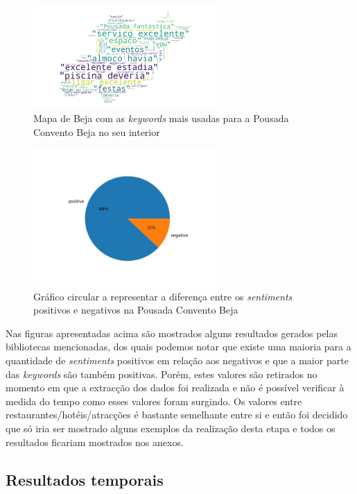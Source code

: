 \begin{figure}[!htb]
\centering
\includegraphics[width=7cm]{figuras/TripAdvisor/Hotels/hotel0_keywordcloud.jpeg}
\caption{Mapa de Beja com as \textit{keywords} mais usadas para a Pousada Convento Beja no seu interior}
\label{fig:exemplofig}
\end{figure}

\begin{figure}[!htb]
\centering
\includegraphics[width=7cm]{figuras/TripAdvisor/Hotels/hotel0_sentiments.jpeg}
\caption{Gráfico circular a representar a diferença entre os \textit{sentiments} positivos e negativos na Pousada Convento Beja}
\label{fig:exemplofig}
\end{figure}

\newpage

Nas figuras apresentadas acima são mostrados alguns resultados gerados pelas bibliotecas mencionadas, dos quais podemos notar que existe uma maioria para a quantidade de \textit{sentiments} positivos em relação aos negativos e que a maior parte das \textit{keywords} são também positivas. Porém, estes valores são retirados no momento em que a extracção dos dados foi realizada e não é possível verificar à medida do tempo como esses valores foram surgindo. Os valores entre restaurantes/hotéis/atracções é bastante semelhante entre si e então foi decidido que só iria ser mostrado alguns exemplos da realização desta etapa e todos os resultados ficariam mostrados nos anexos.

\subsection{Resultados temporais}

